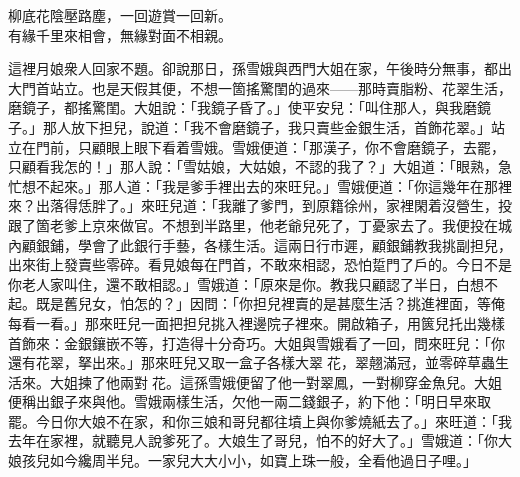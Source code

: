 \begin{myquote}
柳底花陰壓路塵，一回遊賞一回新。\\有緣千里來相會，無緣對面不相親。
\end{myquote}

這裡月娘衆人回家不題。卻說那日，孫雪娥與西門大姐在家，午後時分無事，都出大門首站立。也是天假其便，不想一箇搖驚閨的過來——那時賣脂粉、花翠生活，磨鏡子，都搖驚閨。大姐說：「我鏡子昏了。」使平安兒：「叫住那人，與我磨鏡子。」那人放下担兒，說道：「我不會磨鏡子，我只賣些金銀生活，首飾花翠。」站立在門前，只顧眼上眼下看着雪娥。雪娥便道：「那漢子，你不會磨鏡子，去罷，只顧看我怎的！」{}那人說：「雪姑娘，大姑娘，不認的我了？」大姐道：「眼熟，急忙想不起來。」那人道：「我是爹手裡出去的來旺兒。」雪娥便道：「你這幾年在那裡來？出落得恁胖了。」來旺兒道：「我離了爹門，到原籍徐州，家裡閑着沒營生，投跟了箇老爹上京來做官。不想到半路里，他老爺兒死了，丁憂家去了。我便投在城內顧銀鋪，學會了此銀行手藝，各樣生活。這兩日行市遲，顧銀鋪教我挑副担兒，出來街上發賣些零碎。看見娘每在門首，不敢來相認，恐怕踅門了戶的。今日不是你老人家叫住，還不敢相認。」雪娥道：「原來是你。教我只顧認了半日，白想不起。既是舊兒女，怕怎的？」因問：「你担兒裡賣的是甚麼生活？挑進裡面，等俺每看一看。」那來旺兒一面把担兒挑入裡邊院子裡來。開啟箱子，用篋兒托出幾樣首飾來：金銀鑲嵌不等，打造得十分奇巧。大姐與雪娥看了一回，問來旺兒：「你還有花翠，拏出來。」那來旺兒又取一盒子各樣大翠𩬆花，翠翹滿冠，並零碎草蟲生活來。大姐揀了他兩對𩬆花。這孫雪娥便留了他一對翠鳳，一對柳穿金魚兒。大姐便稱出銀子來與他。雪娥兩樣生活，欠他一兩二錢銀子，約下他：「明日早來取罷。今日你大娘不在家，和你三娘和哥兒都往墳上與你爹燒紙去了。」來旺道：「我去年在家裡，就聽見人說爹死了。大娘生了哥兒，怕不的好大了。」雪娥道：「你大娘孩兒如今纔周半兒。一家兒大大小小，如寶上珠一般，全看他過日子哩。」

